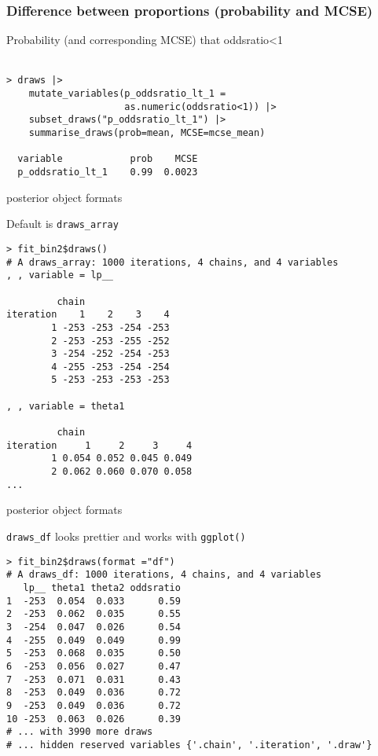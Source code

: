 \documentclass[finnish,english,t]{beamer}
\begin{document}
\begin{frame}[fragile]
  \frametitle{Difference between proportions (probability and MCSE)}

  Probability (and corresponding MCSE) that oddsratio<1
  \\~
  
{\small
\begin{lstlisting}
> draws |>
    mutate_variables(p_oddsratio_lt_1 =
                     as.numeric(oddsratio<1)) |>
    subset_draws("p_oddsratio_lt_1") |>
    summarise_draws(prob=mean, MCSE=mcse_mean)

  variable            prob    MCSE
  p_oddsratio_lt_1    0.99  0.0023
\end{lstlisting}
  }

\end{frame}

\begin{frame}[fragile]{posterior object formats}

  Default is \texttt{draws\_array}
  
{\footnotesize
\begin{lstlisting}
> fit_bin2$draws()
# A draws_array: 1000 iterations, 4 chains, and 4 variables
, , variable = lp__

         chain
iteration    1    2    3    4
        1 -253 -253 -254 -253
        2 -253 -253 -255 -252
        3 -254 -252 -254 -253
        4 -255 -253 -254 -254
        5 -253 -253 -253 -253

, , variable = theta1

         chain
iteration     1     2     3     4
        1 0.054 0.052 0.045 0.049
        2 0.062 0.060 0.070 0.058
...
\end{lstlisting}
  }

\end{frame}

\begin{frame}[fragile]{posterior object formats}

  \texttt{draws\_df} looks prettier and works with \texttt{ggplot()}
  
  {\footnotesize
\begin{lstlisting}
> fit_bin2$draws(format ="df")
# A draws_df: 1000 iterations, 4 chains, and 4 variables
   lp__ theta1 theta2 oddsratio
1  -253  0.054  0.033      0.59
2  -253  0.062  0.035      0.55
3  -254  0.047  0.026      0.54
4  -255  0.049  0.049      0.99
5  -253  0.068  0.035      0.50
6  -253  0.056  0.027      0.47
7  -253  0.071  0.031      0.43
8  -253  0.049  0.036      0.72
9  -253  0.049  0.036      0.72
10 -253  0.063  0.026      0.39
# ... with 3990 more draws
# ... hidden reserved variables {'.chain', '.iteration', '.draw'}
\end{lstlisting}
  }

\end{frame}
\end{document}
